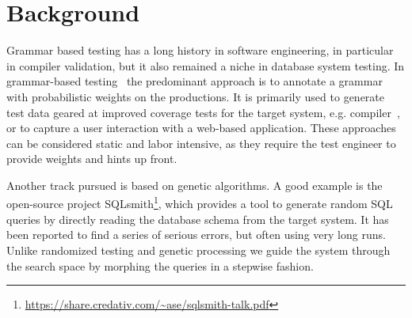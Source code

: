 \documentclass{cidr-2019}
\begin{document}
\section{Background}\label{background}


Grammar based testing has a long history in software engineering, in particular
in compiler validation, but it also remained a niche in database system
testing. In grammar-based testing~\cite{10.1007/11754008_2,ZAMLI20111741} the
predominant approach is to annotate a grammar with probabilistic weights on the
productions. It is primarily used to generate test data geared at improved
coverage tests for the target system,
e.g. compiler~\cite{10.1007/978-3-642-41707-8_2}, or to capture a user
interaction with a web-based application.  These approaches can be considered
static and labor intensive, as they require the test engineer to provide weights
and hints up front.

Another track pursued is based on genetic algorithms. A good example
is the open-source project
SQLsmith\footnote{\url{https://share.credativ.com/~ase/sqlsmith-talk.pdf}},
which provides a tool to generate random SQL queries by directly
reading the database schema from the target system. It has been
reported to find a series of serious errors, but often using very long
runs.  Unlike randomized testing and genetic processing we guide the
system through the search space by morphing the queries in a stepwise
fashion.
\end{document}
